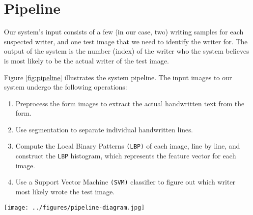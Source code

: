 \section{Pipeline}
Our system's input consists of a few (in our case, two) writing samples for each suspected writer, and one test image that we need to identify the writer for. The output of the system is the number (index) of the writer who the system believes is most likely to be the actual writer of the test image.

Figure \ref{fig:pipeline} illustrates the system pipeline. The input images to our system undergo the following operations:
\begin{enumerate}
    \item Preprocess the form images to extract the actual handwritten text from the form.
    \item Use segmentation to separate individual handwritten lines.
    \item Compute the Local Binary Patterns \texttt{(LBP)} of each image, line by line, and construct the \texttt{LBP} histogram, which represents the feature vector for each image.
    \item Use a Support Vector Machine \texttt{(SVM)} classifier to figure out which writer most likely wrote the test image.
\end{enumerate}

\begin{figure*}[]
    \centering
    \texttt{[image: ../figures/pipeline-diagram.jpg]}
    \label{fig:pipeline}
\end{figure*}



